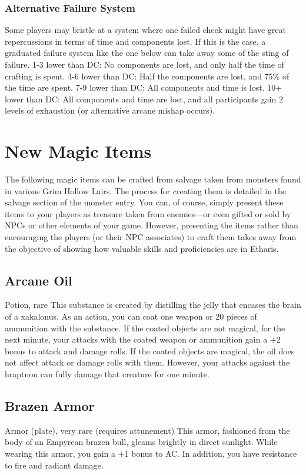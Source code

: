 \documentclass[10pt,a4paper,twoside,twocolumn,openany,bg=print,nodeprecatedcode]{dndbook}
\begin{document}
\subsubsection{Alternative Failure System}
Some players may bristle at a system where one failed check might have great repercussions in terms of time and components lost. If this is the case, a graduated failure system like the one below can take away some of the sting of failure.
1-3 lower than DC: No components are lost, and only half the time of crafting is spent.
4-6 lower than DC: Half the components are lost, and 75\% of the time are spent.
7-9 lower than DC: All components and time is lost.
10+ lower than DC: All components and time are lost, and all participants gain 2 levels of exhaustion (or alternative arcane mishap occurs).
\section{New Magic Items}
The following magic items can be crafted from salvage taken from monsters found in various Grim Hollow Lairs. The process for creating them is detailed in the salvage section of the monster entry.
You can, of course, simply present these items to your players as treasure taken from enemies—or even gifted or sold by NPCs or other elements of your game. However, presenting the items rather than encouraging the players (or their NPC associates) to craft them takes away from the objective of showing how valuable skills and proficiencies are in Etharis.
\subsection{Arcane Oil}
Potion, rare
This substance is created by distilling the jelly that encases the brain of a xakalonus. As an action, you can coat one weapon or 20 pieces of ammunition with the substance.
If the coated objects are not magical, for the next minute, your attacks with the coated weapon or ammunition gain a +2 bonus to attack and damage rolls.
If the coated objects are magical, the oil does not affect attack or damage rolls with them. However, your attacks against the hraptnon can fully damage that creature for one minute.
\subsection{Brazen Armor}
Armor (plate), very rare (requires attunement)
This armor, fashioned from the body of an Empyrean brazen bull, gleams brightly in direct sunlight. While wearing this armor, you gain a +1 bonus to AC. In addition, you have resistance to fire and radiant damage.
\end{document}
